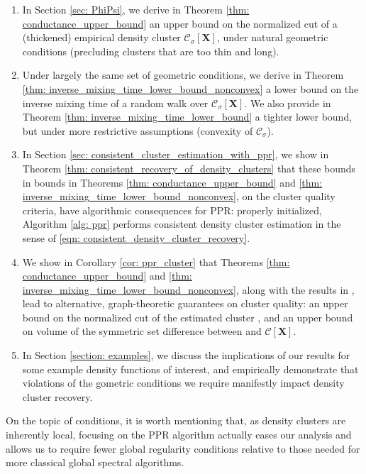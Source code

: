\documentclass{article}
\newcommand{\1}{\mathbf{1}}
\newcommand{\Xbf}{\mathbf{X}}
\newcommand{\Cset}{\mathcal{C}}
\newcommand{\Csig}{\Cset_{\sigma}}
\theoremstyle{aldenthm}
\theoremstyle{aldenrmrk}
\begin{document}
\begin{enumerate}
\item In Section \ref{sec: PhiPsi}, we derive in Theorem \ref{thm:
    conductance_upper_bound} an upper bound on the normalized cut of a
  (thickened) empirical density cluster $\Csig[\Xbf]$, under natural geometric 
  conditions (precluding clusters that are too thin and long).  

\item Under largely the same set of geometric conditions, we derive in Theorem
  \ref{thm: inverse_mixing_time_lower_bound_nonconvex} a lower bound on the
  inverse mixing time of a random walk over $\Csig[\Xbf]$.  We also provide in 
  Theorem \ref{thm: inverse_mixing_time_lower_bound} a tighter lower bound, but
  under more restrictive assumptions (convexity of $\Csig$).
	
\item In Section \ref{sec: consistent_cluster_estimation_with_ppr}, we show in
  Theorem \ref{thm: consistent_recovery_of_density_clusters} that these bounds
  in bounds in Theorems \ref{thm: conductance_upper_bound} and \ref{thm:
    inverse_mixing_time_lower_bound_nonconvex},
  on the cluster quality criteria, have algorithmic consequences for PPR:
  properly initialized, Algorithm \ref{alg: ppr} performs consistent density
  cluster estimation in the sense of \eqref{eqn:
    consistent_density_cluster_recovery}. 
	
\item We show in Corollary \ref{cor: ppr_cluster} that Theorems \ref{thm:
    conductance_upper_bound} and \ref{thm:
    inverse_mixing_time_lower_bound_nonconvex}, along with the results in 
  \citet{zhu2013}, lead to alternative, graph-theoretic guarantees on cluster 
  quality: an upper bound on the normalized cut of the estimated cluster 
  , and an upper bound on volume of the symmetric set
  difference between  and $\Cset[\Xbf]$.    

\item In Section \ref{section: examples}, we discuss the implications of our
  results for some example density functions of interest, and empirically
  demonstrate that violations of the gometric conditions we require manifestly
  impact density cluster recovery. 
\end{enumerate}

On the topic of conditions, it is worth mentioning that, as density clusters
are inherently local, focusing on the PPR algorithm actually eases our analysis
and allows us to require fewer global regularity conditions relative to those
needed for more classical global spectral algorithms.    
\end{document}
